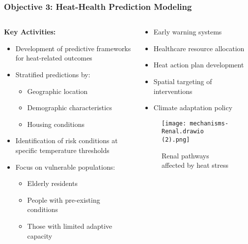\documentclass[aspectratio=169]{beamer}
\begin{document}
\begin{frame}
    \frametitle{Objective 3: Heat-Health Prediction Modeling}
    
    \begin{columns}[T]
        \begin{column}{0.55\textwidth}
            \textbf{\large Key Activities:}
            \begin{itemize}[leftmargin=*, itemsep=6pt]
                \item Development of predictive frameworks for heat-related outcomes
                \item Stratified predictions by:
                \begin{itemize}[itemsep=4pt]
                    \item Geographic location
                    \item Demographic characteristics
                    \item Housing conditions
                \end{itemize}
                \item Identification of risk conditions at specific temperature thresholds
                \item Focus on vulnerable populations:
                \begin{itemize}[itemsep=4pt]
                    \item Elderly residents
                    \item People with pre-existing conditions
                    \item Those with limited adaptive capacity
                \end{itemize}
            \end{itemize}
        \end{column}
        \begin{column}{0.42\textwidth}
            \begin{impactbox}
                \begin{itemize}[leftmargin=*, itemsep=6pt]
                    \item Early warning systems
                    \item Healthcare resource allocation
                    \item Heat action plan development
                    \item Spatial targeting of interventions
                    \item Climate adaptation policy
                \end{itemize}
            \end{impactbox}
            
            \begin{figure}
                \texttt{[image: mechanisms-Renal.drawio (2).png]}
                \caption{\small Renal pathways affected by heat stress}
            \end{figure}
        \end{column}
    \end{columns}
\end{frame}
\end{document}
